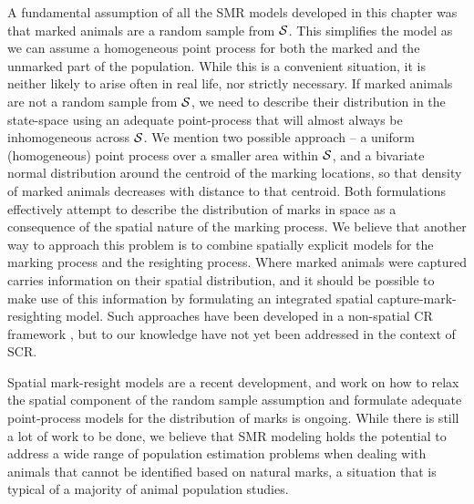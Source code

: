 A fundamental assumption of all the SMR models developed in this
chapter was that marked animals are a random sample from ${\cal
  S}$. This simplifies the model as we can assume a homogeneous point
process for both the marked and the unmarked part of the
population. While this is a convenient situation, it is neither likely
to arise often in real life, nor strictly necessary.  If marked
animals are not a random sample from ${\cal S}$, we need to describe
their distribution in the state-space using an adequate point-process
that will almost always be inhomogeneous across ${\cal S}$.  We
mention two possible approach -- a uniform (homogeneous) point process
over a smaller area within ${\cal S}$, and a bivariate normal
distribution around the centroid of the marking locations, so that
density of marked animals decreases with distance to that centroid.
Both formulations effectively attempt to describe the distribution of
marks in space as a consequence of the spatial nature of the marking
process. We believe that another way to approach this problem is to
combine spatially explicit models for the marking process and the
resighting process. Where marked animals were captured carries
information on their spatial distribution, and it should be possible
to make use of this information by formulating an integrated spatial
capture-mark-resighting model. Such approaches have been developed in
a non-spatial CR framework \citep{matechou_etal:2013,
  pledger_etal:2009}, but to our knowledge have not yet been addressed
in the context of SCR.

 Spatial mark-resight models are a recent
development, and work on how to relax the spatial component of the
random sample assumption and formulate adequate point-process models for the distribution of marks is ongoing. While there is still a lot of work to be done, we believe that SMR modeling holds the
potential to address a wide range of population estimation problems
when dealing with animals that cannot be identified based on natural
marks, a situation that is typical of a majority of animal population
studies.



